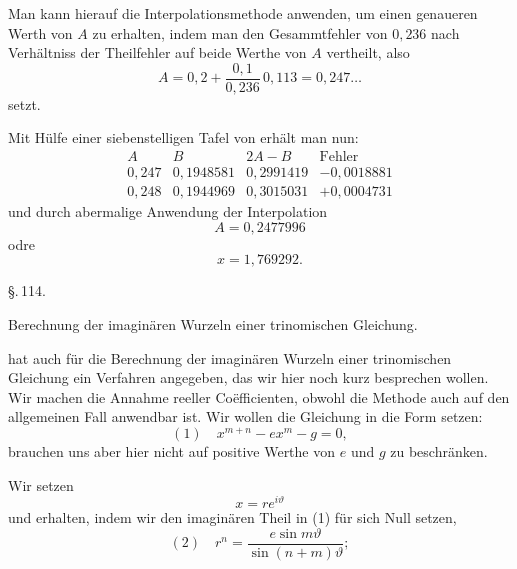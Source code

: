 
Man kann hierauf die Interpolationsmethode anwenden, um einen genaueren Werth von $A$ zu erhalten, indem man den Gesammtfehler von $0{,}236$ nach Verhältniss der Theilfehler auf beide Werthe von $A$ vertheilt, also
\[
A = 0{,}2 + \frac{0{,}1}{0{,}236}\,0{,}113 = 0{,}247\ldots
\]
setzt.

Mit Hülfe einer siebenstelligen Tafel von  erhält man nun:
\[
\begin{array}{c|c|c|c}
A & B & 2A - B & \text{Fehler} \\
\hline
0{,}247 & 0{,}1948581 & 0{,}2991419 & -0{,}0018881 \\
0{,}248 & 0{,}1944969 & 0{,}3015031 & +0{,}0004731
\end{array}
\]
und durch abermalige Anwendung der Interpolation
\[
A = 0{,}2477996
\]
odre %
\[
x = 1{,}769292.
\]

\begin{center}
\S.\,114.

Berechnung der imaginären Wurzeln einer trinomischen Gleichung.
\end{center}

 hat auch für die Berechnung der imaginären Wurzeln einer trinomischen Gleichung ein Verfahren angegeben, das wir hier noch kurz besprechen wollen. Wir machen die Annahme reeller Coëfficienten, obwohl die Methode auch auf den allgemeinen Fall anwendbar ist. Wir wollen die Gleichung in die Form setzen:
\[
(1)\quad x^{m+n} - ex^m - g = 0,
\]
brauchen uns aber hier nicht auf positive Werthe von $e$ und $g$ zu beschränken.

Wir setzen
\[
x = re^{i\vartheta}
\]
und erhalten, indem wir den imaginären Theil in (1) für sich Null setzen,
\[
(2)\quad r^n = \frac{e\sin m\vartheta}{\sin(n+m)\vartheta};
\]

